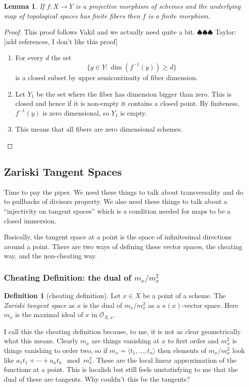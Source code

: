 \documentclass[12pt]{article}
\numberwithin{equation}{section}
\newtheorem{lemma}[theorem]{Lemma}
\theoremstyle{definition}
\newtheorem{definition}[theorem]{Definition}
\theoremstyle{remark}
\newcommand{\Ocal}{\mathcal{O}}
\newcommand{\taylor}[1]{{\color{blue} \sf $\spadesuit\spadesuit\spadesuit$ Taylor: [#1]}}
\begin{document}
\begin{lemma}
	If $f:X\to Y$ is a projective morphism of schemes and the underlying map of topological spaces has finite fibers then $f$ is a finite morphism.
\end{lemma}
\begin{proof}
	This proof follows Vakil and we actually need quite a bit. \taylor{add references, I don't like this proof}
	\begin{enumerate}
		\item For every $d$ the set
		 $$\lbrace y \in Y : \dim (f^{-1}(y)) \geq d \rbrace$$
		 is a closed subset by upper semicontinuity of fiber dimension.
		\item Let $Y_1$ be the set where the fiber has dimension bigger than zero.
		This is closed and hence if it is non-empty it contains a closed point. 
		By finiteness, $f^{-1}(y)$ is zero dimensional, so $Y_1$ is empty.
		\item This means that all fibers are zero dimensional schemes.  
	\end{enumerate}
\end{proof}

\subsection{Zariski Tangent Spaces}
Time to pay the piper. 
We need these things to talk about transversality and do to pullbacks of divisors property. 
We also need these things to talk about a ``injectivity on tangent spaces'' which is a condition needed for maps to be a closed immersion.

Basically, the tangent space at a point is the space of infinitesimal directions around a point. 
There are two ways of defining these vector spaces, the cheating way, and the non-cheating way. 

\subsubsection{Cheating Definition: the dual of $m_x/m_x^2$}
\begin{definition}[cheating definition]
	Let $x\in X$ be a point of a scheme. 
	The \emph{Zariski tangent space} as $x$ is the dual of $m_x/m_x^2$ as a $\kappa(x)$-vector space. 
	Here $m_x$ is the maximal ideal of $x$ in $\Ocal_{X,x}$.
\end{definition}

I call this the cheating definition because, to me, it is not as clear geometrically what this means. 
Clearly $m_x$ are things vanishing at $x$ to first order and $m_x^2$ is things vanishing to order two, so if $m_x=\langle t_1,\ldots,t_n\rangle$ then elements of $m_x/m_x^2$ look like $a_1t_1 + \cdots + a_n t_n \mod m_x^2$.
These are the local linear approximation of the functions at a point. 
This is localish but still feels unstatisfying to me that the dual of these are tangents. 
Why couldn't this be the tangents?
\end{document}
